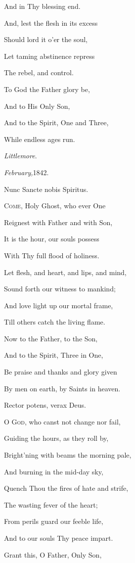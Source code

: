 And in Thy blessing end.

And, lest the flesh in its excess

Should lord it o'er the soul,

Let taming abstinence repress

The rebel, and control.

To God the Father glory be,

And to His Only Son,

And to the Spirit, One and Three,

While endless ages run.

\emph{Littlemore}.

\emph{February,}1842.


Nunc Sancte nobis Spiritus.

C\textsc{ome}, Holy Ghost, who ever One

Reignest with Father and with Son,

It is the hour, our souls possess

With Thy full flood of holiness.

Let flesh, and heart, and lips, and mind,

Sound forth our witness to mankind;

And love light up our mortal frame,

Till others catch the living flame.

Now to the Father, to the Son,

And to the Spirit, Three in One,

Be praise and thanks and glory given

By men on earth, by Saints in heaven.


Rector potens, verax Deus.

O G\textsc{od}, who canst not change nor fail,

Guiding the hours, as they roll by,

Bright'ning with beams the morning pale,

And burning in the mid-day sky,

Quench Thou the fires of hate and strife,

The wasting fever of the heart;

From perils guard our feeble life,

And to our souls Thy peace impart.

Grant this, O Father, Only Son,

